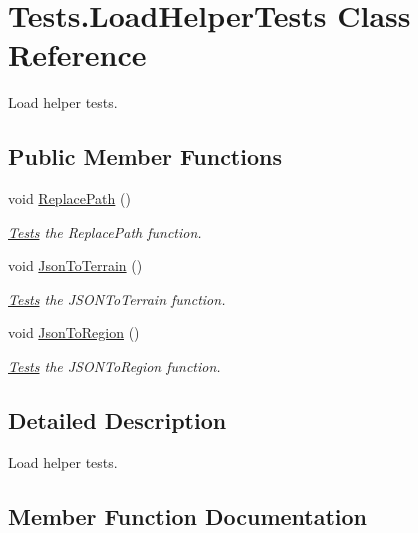 \hypertarget{classTests_1_1LoadHelperTests}{}\section{Tests.\+Load\+Helper\+Tests Class Reference}
\label{classTests_1_1LoadHelperTests}


Load helper tests.  


\subsection*{Public Member Functions}
\begin{DoxyCompactItemize}
\item 
void \hyperlink{classTests_1_1LoadHelperTests_aa557bb86e9f813e4d0281a8a367b0664}{Replace\+Path} ()
\begin{DoxyCompactList}\small\item\em \hyperlink{namespaceTests}{Tests} the Replace\+Path function. \end{DoxyCompactList}\item 
void \hyperlink{classTests_1_1LoadHelperTests_ae34f5e6da50c686c0ef1fe661750ec54}{Json\+To\+Terrain} ()
\begin{DoxyCompactList}\small\item\em \hyperlink{namespaceTests}{Tests} the J\+S\+O\+N\+To\+Terrain function. \end{DoxyCompactList}\item 
void \hyperlink{classTests_1_1LoadHelperTests_ac4365f4e089be94e73c1ca9522ae2378}{Json\+To\+Region} ()
\begin{DoxyCompactList}\small\item\em \hyperlink{namespaceTests}{Tests} the J\+S\+O\+N\+To\+Region function. \end{DoxyCompactList}\end{DoxyCompactItemize}


\subsection{Detailed Description}
Load helper tests. 



\subsection{Member Function Documentation}
\hypertarget{classTests_1_1LoadHelperTests_ac4365f4e089be94e73c1ca9522ae2378}{}
